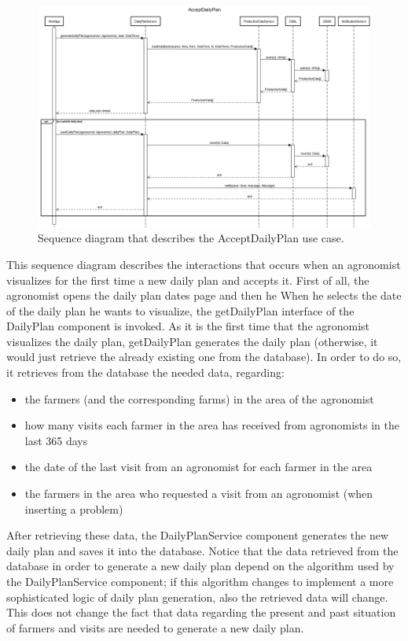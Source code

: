 \documentclass{article}
\begin{document}
\newpage
\begin{figure}[H]
   \centering
   \includegraphics[scale=0.25]{diagrams/sequence diagrams/AcceptDailyPlan.png}
    \caption{Sequence diagram that describes the AcceptDailyPlan use case.}
\end{figure}
This sequence diagram describes the interactions that occurs when an agronomist visualizes for the first time a new daily plan and accepts it. \newline
First of all, the agronomist opens the daily plan dates page and then he When he selects the date of the daily plan he wants to visualize, the getDailyPlan interface of the DailyPlan component is invoked. As it is the first time that the agronomist visualizes the daily plan, getDailyPlan generates the daily plan (otherwise, it would just retrieve the already existing one from the database). In order to do so, it retrieves from the database the needed data, regarding:
\begin{itemize}
    \item the farmers (and the corresponding farms) in the area of the agronomist
    \item how many visits each farmer in the area has received from agronomists in the last 365 days
    \item the date of the last visit from an agronomist for each farmer in the area
    \item the farmers in the area who requested a visit from an agronomist (when inserting a problem)
\end{itemize}
After retrieving these data, the DailyPlanService component generates the new daily plan and saves it into the database. \newline
Notice that the data retrieved from the database in order to generate a new daily plan depend on the algorithm used by the DailyPlanService component; if this algorithm changes to implement a more sophisticated logic of daily plan generation, also the retrieved data will change. This does not change the fact that data regarding the present and past situation of farmers and visits are needed to generate a new daily plan. \newline
\end{document}
